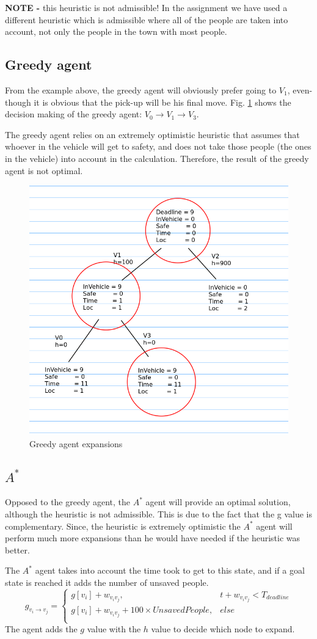 \documentclass{article}                     %
\begin{document}
	\textbf{NOTE - } this heuristic is not admissible! In the assignment we have used a different heuristic which is admissible where all of the people are taken into account, not only the people in the town with most people.
	
	
	\subsection{Greedy agent}
	From the example above, the greedy agent will obviously prefer going to $ V_1 $, even-though it is obvious that the pick-up will be his final move. Fig. \ref{fig:q2a} shows the decision making of the greedy agent: $ V_0 \rightarrow V_1 \rightarrow V_3 $.
	
	The greedy agent relies on an extremely optimistic heuristic that assumes that whoever in the vehicle will get to safety, and does not take those people (the ones in the vehicle) into account in the calculation. Therefore, the result of the greedy agent is not optimal.
	
	\begin{figure}
		\centering
		\includegraphics[width=0.5\linewidth]{q2a}
		\caption{Greedy agent expansions}
		\label{fig:q2a}
	\end{figure}
	
	
	\subsection{$ A^* $}
	Opposed to the greedy agent, the $ A^* $ agent will provide an optimal solution, although the heuristic is not admissible. This is due to the fact that the g value is complementary. Since, the heuristic is extremely optimistic the $ A^* $ agent will perform much more expansions than he would have needed if the heuristic was better.
	
	The $ A^* $ agent takes into account the time took to get to this state, and if a goal state is reached it adds the number of unsaved  people.
	\begin{equation}\label{eq:g_val}
		g_{v_i\rightarrow v_j}=
		\begin{cases}
		g[v_i] + w_{v_iv_j},& t + w_{v_iv_j} < T_{deadline}\\
		g[v_i] + w_{v_iv_j} + 100\times UnsavedPeople,& else\\
		\end{cases}
	\end{equation} 
	The agent adds the $ g $ value with the $ h $ value to decide which node to expand.
	
\end{document}
